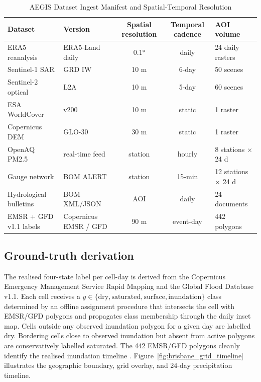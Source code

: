 \begin{table}[htbp]
\caption{AEGIS Dataset Ingest Manifest and Spatial-Temporal Resolution}
\label{tab:dataset_manifest}
\centering
\small
\renewcommand{\arraystretch}{1.35}
\begin{tabularx}{\linewidth}{p{3.2cm} p{2.8cm} c c X}
\toprule
\textbf{Dataset} & \textbf{Version} & \textbf{Spatial resolution} & \textbf{Temporal cadence} & \textbf{AOI volume} \\
\midrule
ERA5 reanalysis & ERA5-Land daily & 0.1° & daily & 24 daily rasters \\ \addlinespace[0.4em]
Sentinel-1 SAR & GRD IW & 10 m & 6-day & 50 scenes \\ \addlinespace[0.4em]
Sentinel-2 optical & L2A & 10 m & 5-day & 60 scenes \\ \addlinespace[0.4em]
ESA WorldCover & v200 & 10 m & static & 1 raster \\ \addlinespace[0.4em]
Copernicus DEM & GLO-30 & 30 m & static & 1 raster \\ \addlinespace[0.4em]
OpenAQ PM2.5 & real-time feed & station & hourly & 8 stations $\times$ 24 d \\ \addlinespace[0.4em]
Gauge network & BOM ALERT & station & 15-min & 12 stations $\times$ 24 d \\ \addlinespace[0.4em]
Hydrological bulletins & BOM XML/JSON & AOI & daily & 24 documents \\ \addlinespace[0.4em]
EMSR + GFD v1.1 labels & Copernicus EMSR / GFD & 90 m & event-day & 442 polygons \\
\bottomrule
\end{tabularx}
\end{table}

\subsection{Ground-truth derivation}

The realised four-state label per cell-day is derived from the Copernicus Emergency Management Service Rapid Mapping and the Global Flood Database v1.1. Each cell receives a $y \in \{\text{dry}, \text{saturated}, \text{surface}, \text{inundation}\}$ class determined by an offline assignment procedure that intersects the cell with EMSR/GFD polygons and propagates class membership through the daily inset map. Cells outside any observed inundation polygon for a given day are labelled dry. Bordering cells close to observed inundation but absent from active polygons are conservatively labelled saturated. The 442 EMSR/GFD polygons cleanly identify the realised inundation timeline \citep{hofmeister2023cross, hofmeister2024semantic}. Figure~\ref{fig:brisbane_grid_timeline} illustrates the geographic boundary, grid overlay, and 24-day precipitation timeline.

